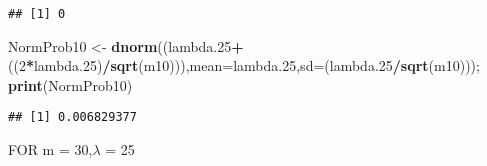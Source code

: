 \documentclass[
]{article}
\newenvironment{Shaded}{\begin{snugshade}}{\end{snugshade}}
\newcommand{\DataTypeTok}[1]{\textcolor[rgb]{0.13,0.29,0.53}{#1}}
\newcommand{\DecValTok}[1]{\textcolor[rgb]{0.00,0.00,0.81}{#1}}
\newcommand{\FloatTok}[1]{\textcolor[rgb]{0.00,0.00,0.81}{#1}}
\newcommand{\KeywordTok}[1]{\textcolor[rgb]{0.13,0.29,0.53}{\textbf{#1}}}
\newcommand{\NormalTok}[1]{#1}
\newcommand{\OperatorTok}[1]{\textcolor[rgb]{0.81,0.36,0.00}{\textbf{#1}}}
\newcommand{\StringTok}[1]{\textcolor[rgb]{0.31,0.60,0.02}{#1}}
\begin{document}
\begin{verbatim}
## [1] 0
\end{verbatim}

\begin{Shaded}
\begin{Highlighting}[]
\NormalTok{NormProb10 <-}\StringTok{ }\KeywordTok{dnorm}\NormalTok{((lambda}\FloatTok{.25}\OperatorTok{+}\NormalTok{((}\DecValTok{2}\OperatorTok{*}\NormalTok{lambda}\FloatTok{.25}\NormalTok{)}\OperatorTok{/}\KeywordTok{sqrt}\NormalTok{(m10))),}\DataTypeTok{mean=}\NormalTok{lambda}\FloatTok{.25}\NormalTok{,}\DataTypeTok{sd=}\NormalTok{(lambda}\FloatTok{.25}\OperatorTok{/}\KeywordTok{sqrt}\NormalTok{(m10))); }\KeywordTok{print}\NormalTok{(NormProb10)}
\end{Highlighting}
\end{Shaded}

\begin{verbatim}
## [1] 0.006829377
\end{verbatim}

FOR m = 30,\(\lambda\) = 25
\end{document}
